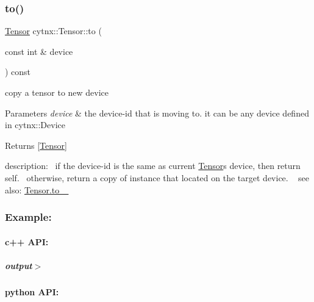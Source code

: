 \subsubsection{\texorpdfstring{to()}{to()}}
{\footnotesize\ttfamily \hyperlink{classcytnx_1_1Tensor}{Tensor} cytnx\+::\+Tensor\+::to (\begin{DoxyParamCaption}\item[{const int \&}]{device }\end{DoxyParamCaption}) const\hspace{0.3cm}{\ttfamily [inline]}}



copy a tensor to new device 


\begin{DoxyParams}{Parameters}
{\em device} & the device-\/id that is moving to. it can be any device defined in cytnx\+::\+Device \\
\hline
\end{DoxyParams}
\begin{DoxyReturn}{Returns}
\mbox{[}\hyperlink{classcytnx_1_1Tensor}{Tensor}\mbox{]}
\end{DoxyReturn}
description\+:~\newline
 if the device-\/id is the same as current \hyperlink{classcytnx_1_1Tensor}{Tensor}\textquotesingle{}s device, then return self.~\newline
 otherwise, return a copy of instance that located on the target device. ~\newline
 see also\+: \hyperlink{classcytnx_1_1Tensor_a114a31fbb8bf4a90f150b6a67e42183a}{Tensor.\+to\+\_\+ } ~\newline
 \subsubsection*{Example\+:}

\paragraph*{c++ A\+PI\+:}


\begin{DoxyCodeInclude}
\end{DoxyCodeInclude}
 \subparagraph*{output$>$}


\begin{DoxyVerbInclude}
\end{DoxyVerbInclude}
 \paragraph*{python A\+PI\+:}


